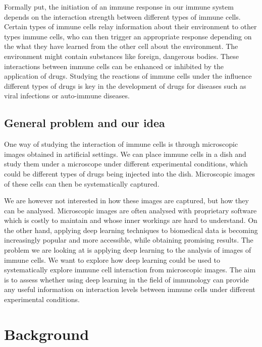 \documentclass{l4proj}
\begin{document}

Formally put, the initiation of an immune response in our immune system depends on the interaction strength between different types of immune cells. Certain types of immune cells relay information about their environment to other types immune cells, who can then trigger an appropriate response depending on the what they have learned from the other cell about the environment. The environment might contain substances like foreign, dangerous bodies. These interactions between immune cells can be enhanced or inhibited by the application of drugs. Studying the reactions of immune cells under the influence different types of drugs is key in the development of drugs for diseases such as viral infections or auto-immune diseases.

\section{General problem and our idea}

One way of studying the interaction of immune cells is through microscopic images obtained in artificial settings. We can place immune cells in a dish and study them under a microscope under different experimental conditions, which could be different types of drugs being injected into the dish. Microscopic images of these cells can then be systematically captured.

We are however not interested in how these images are captured, but how they can be analysed. Microscopic images are often analysed with proprietary software which is costly to maintain and whose inner workings are hard to understand. On the other hand, applying deep learning techniques to biomedical data is becoming increasingly popular and more accessible, while obtaining promising results. The problem we are looking at is applying deep learning to the analysis of images of immune cells. We want to explore how deep learning could be used to systematically explore immune cell interaction from microscopic images. The aim is to assess whether using deep learning in the field of immunology can provide any useful information on interaction levels between immune cells under different experimental conditions.

\chapter{Background}
\end{document}
